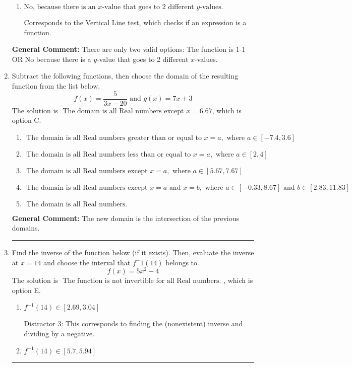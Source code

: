 \documentclass{extbook}[14pt]
\newcommand{\litem}[1]{\item #1

\rule{\textwidth}{0.4pt}}
\begin{document}
\begin{enumerate}
{\begin{enumerate}[label=\Alph*.]
Corresponds to believing the function passes the Horizontal Line test.
\item \( \text{No, because there is an $x$-value that goes to 2 different $y$-values.} \)

Corresponds to the Vertical Line test, which checks if an expression is a function.
\end{enumerate}

\textbf{General Comment:} There are only two valid options: The function is 1-1 OR No because there is a $y$-value that goes to 2 different $x$-values.
}
\litem{
Subtract the following functions, then choose the domain of the resulting function from the list below.
\[ f(x) = \frac{5}{3x-20} \text{ and } g(x) = 7x + 3 \]The solution is \( \text{ The domain is all Real numbers except } x = 6.67 \), which is option C.\begin{enumerate}[label=\Alph*.]
\item \( \text{ The domain is all Real numbers greater than or equal to } x = a, \text{ where } a \in [-7.4, 3.6] \)


\item \( \text{ The domain is all Real numbers less than or equal to } x = a, \text{ where } a \in [2, 4] \)


\item \( \text{ The domain is all Real numbers except } x = a, \text{ where } a \in [5.67, 7.67] \)


\item \( \text{ The domain is all Real numbers except } x = a \text{ and } x = b, \text{ where } a \in [-0.33, 8.67] \text{ and } b \in [2.83, 11.83] \)


\item \( \text{ The domain is all Real numbers. } \)


\end{enumerate}

\textbf{General Comment:} The new domain is the intersection of the previous domains.
}
\litem{
Find the inverse of the function below (if it exists). Then, evaluate the inverse at $x = 14$ and choose the interval that $f^-1(14)$ belongs to.
\[ f(x) = 5 x^2 - 4 \]The solution is \( \text{ The function is not invertible for all Real numbers. } \), which is option E.\begin{enumerate}[label=\Alph*.]
\item \( f^{-1}(14) \in [2.69, 3.04] \)

 Distractor 3: This corresponds to finding the (nonexistent) inverse and dividing by a negative.
\item \( f^{-1}(14) \in [5.7, 5.94] \)


\end{enumerate}}
\end{enumerate}
\end{document}
